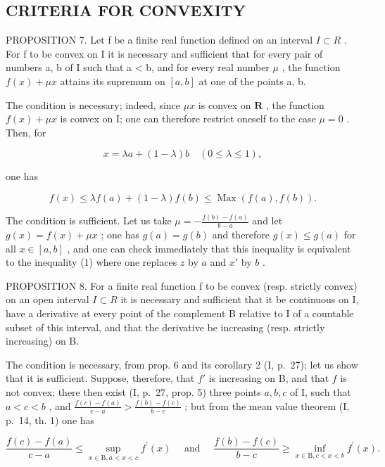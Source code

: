 \subsection{CRITERIA FOR CONVEXITY}

PROPOSITION 7. Let f be a finite real function defined on an interval \(I \subset R\) . For f to be convex on I it is necessary and sufficient that for every pair of numbers a, b of I such that a \textless{} b, and for every real number \(\mu\) , the function \(f(x) + \mu x\) attains its supremum on \([a, b]\) at one of the points a, b.

The condition is necessary; indeed, since \(\mu x\) is convex on \(\mathbf{R}\) , the function \(f(x) + \mu x\) is convex on I; one can therefore restrict oneself to the case \(\mu = 0\) . Then, for

\[
x = \lambda a + (1 - \lambda) b \quad (0 \leqslant \lambda \leqslant 1),
\]

one has

\[
f (x) \leqslant \lambda f (a) + (1 - \lambda) f (b) \leqslant \operatorname{Max} (f (a), f (b)).
\]

The condition is sufficient. Let us take \(\mu = -\frac{f(b) - f(a)}{b - a}\) and let \(g(x) = f(x) + \mu x\) ; one has \(g(a) = g(b)\) and therefore \(g(x) \leqslant g(a)\) for all \(x \in [a, b]\) , and one can check immediately that this inequality is equivalent to the inequality (1) where one replaces \(z\) by \(a\) and \(x'\) by \(b\) .

PROPOSITION 8. For a finite real function f to be convex (resp. strictly convex) on an open interval \(I \subset R\) it is necessary and sufficient that it be continuous on I, have a derivative at every point of the complement B relative to I of a countable subset of this interval, and that the derivative be increasing (resp. strictly increasing) on B.

The condition is necessary, from prop. 6 and its corollary 2 (I, p.~27); let us show that it is sufficient. Suppose, therefore, that \(f'\) is increasing on B, and that \(f\) is not convex; there then exist (I, p.~27, prop. 5) three points \(a, b, c\) of I, such that \(a < c < b\) , and \(\frac{f(c) - f(a)}{c - a} > \frac{f(b) - f(c)}{b - c}\) ; but from the mean value theorem (I, p.~14, th. 1) one has

\[
\frac {f (c) - f (a)}{c - a} \leqslant \sup _ {x \in \mathrm{B}, a <   x <   c} f ^ {\prime} (x) \quad \text { and } \quad \frac {f (b) - f (c)}{b - c} \geqslant \inf _ {x \in \mathrm{B}, c <   x <   b} f ^ {\prime} (x).
\]

